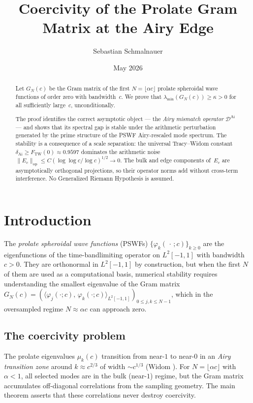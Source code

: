 \documentclass[12pt,a4paper]{amsart}
\title{Coercivity of the Prolate Gram Matrix at the Airy Edge}
\author{Sebastian Schmalnauer}
\date{May 2026}
\theoremstyle{definition}
\newcommand{\DAi}{\mathcal{D}^{\mathrm{Ai}}}
\newcommand{\GN}{G_N(c)}
\newcommand{\Ec}{E_c}
\newcommand{\norm}[1]{\|#1\|}
\newcommand{\ip}[2]{\langle #1,\, #2 \rangle}
\newcommand{\FTW}{F_{\mathrm{TW}}(0)}
\newcommand{\dAi}{\delta_{\mathrm{Ai}}}
\begin{document}
\maketitle

\begin{abstract}
Let $G_N(c)$ be the Gram matrix of the first $N = \lfloor\alpha c\rfloor$
prolate spheroidal wave functions of order zero with bandwidth~$c$.
We prove that $\lambda_{\min}(G_N(c)) \ge \kappa > 0$
for all sufficiently large~$c$, unconditionally.

The proof identifies the correct asymptotic object --- the \emph{Airy
mismatch operator} $\DAi$ --- and shows that its spectral gap is stable
under the arithmetic perturbation generated by the prime structure of the
PSWF Airy-rescaled mode spectrum.
The stability is a consequence of a scale separation:
the universal Tracy--Widom constant $\dAi \ge \FTW \approx 0.9597$
dominates the arithmetic noise
$\norm{\Ec}_{\mathrm{op}} \le C(\log\log c/\log c)^{1/2} \to 0$.
The bulk and edge components of~$\Ec$ are asymptotically orthogonal
projections, so their operator norms add without cross-term interference.
No Generalized Riemann Hypothesis is assumed.
\end{abstract}

\section{Introduction}
\label{sec:intro}

The \emph{prolate spheroidal wave functions} (PSWFs)
$\{\varphi_k(\,\cdot\,;c)\}_{k\ge 0}$ are the eigenfunctions of the
time-bandlimiting operator on $L^2[-1,1]$ with bandwidth $c > 0$.
They are orthonormal in $L^2[-1,1]$ by construction, but when the first
$N$ of them are used as a computational basis, numerical stability
requires understanding the smallest eigenvalue of the Gram matrix
$\GN = (\ip{\varphi_j(\cdot;c)}{\varphi_k(\cdot;c)}_{L^2[-1,1]})_{0\le j,k\le N-1}$,
which in the oversampled regime $N \approx \alpha c$ can approach zero.

\subsection{The coercivity problem}

The prolate eigenvalues $\mu_k(c)$ transition from near-$1$ to near-$0$
in an \emph{Airy transition zone} around $k \approx c^{2/3}$ of width
$\sim c^{1/3}$ (Widom \cite{Widom1964}).
For $N = \lfloor\alpha c\rfloor$ with $\alpha < 1$, all selected modes
are in the bulk (near-$1$) regime, but the Gram matrix accumulates
off-diagonal correlations from the sampling geometry.
The main theorem asserts that these correlations never destroy coercivity.
\end{document}
